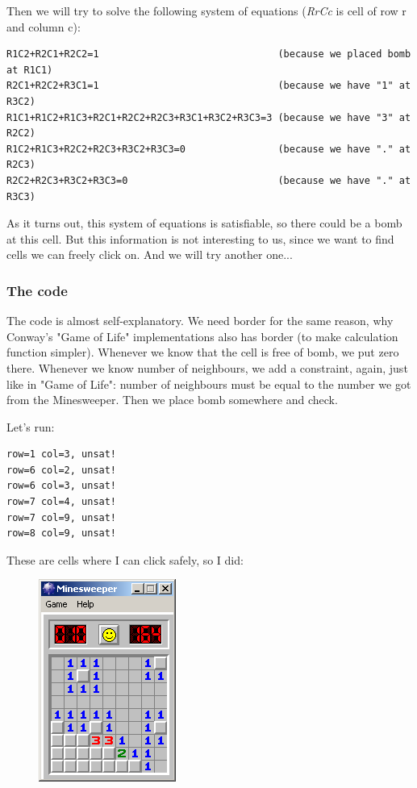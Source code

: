 Then we will try to solve the following system of equations (\textit{RrCc} is cell of row r and column c):

\begin{lstlisting}
R1C2+R2C1+R2C2=1                               (because we placed bomb at R1C1)	
R2C1+R2C2+R3C1=1                               (because we have "1" at R3C2)	
R1C1+R1C2+R1C3+R2C1+R2C2+R2C3+R3C1+R3C2+R3C3=3 (because we have "3" at R2C2)	
R1C2+R1C3+R2C2+R2C3+R3C2+R3C3=0                (because we have "." at R2C3)	
R2C2+R2C3+R3C2+R3C3=0                          (because we have "." at R3C3)
\end{lstlisting}

As it turns out, this system of equations is satisfiable, so there could be a bomb at this cell.
But this information is not interesting to us, since we want to find cells we can freely click on.
And we will try another one...

\subsubsection{The code}



The code is almost self-explanatory.
We need border for the same reason, why Conway's "Game of Life" implementations also has border (to make calculation
function simpler).
Whenever we know that the cell is free of bomb, we put zero there.
Whenever we know number of neighbours, we add a constraint, again, just like in "Game of Life": number of neighbours must be equal to the number we got from the Minesweeper.
Then we place bomb somewhere and check.

Let's run:

\begin{lstlisting}
row=1 col=3, unsat!
row=6 col=2, unsat!
row=6 col=3, unsat!
row=7 col=4, unsat!
row=7 col=9, unsat!
row=8 col=9, unsat!
\end{lstlisting}

These are cells where I can click safely, so I did:

\begin{figure}[H]
\centering
\includegraphics[scale=0.75]{SMT/minesweeper/2.png}
\end{figure}

